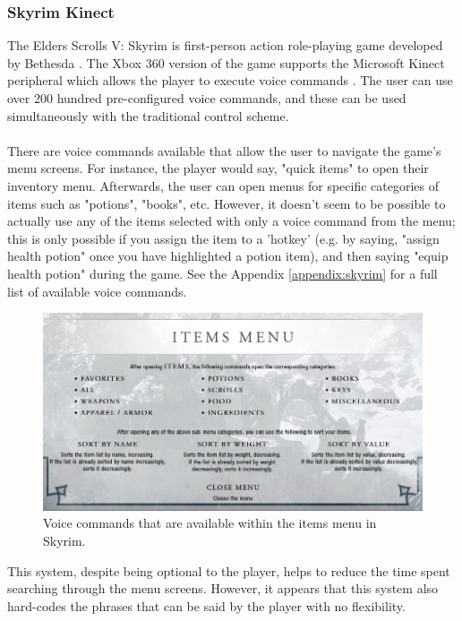 \documentclass[12pt]{article}
\begin{document}
\subsubsection{Skyrim Kinect}
The Elders Scrolls V: Skyrim is first-person action role-playing game developed by Bethesda \cite{RefWorks:23}. The Xbox 360 version of the game supports the Microsoft Kinect peripheral which allows the player to execute voice commands \cite{RefWorks:24}. The user can use over 200 hundred pre-configured voice commands, and these can be used simultaneously with the traditional control scheme.
\\
\\
There are voice commands available that allow the user to navigate the game's menu screens. For instance, the player would say, "quick items" to open their inventory menu. Afterwards, the user can open menus for specific categories of items such as "potions", "books", etc. However, it doesn't seem to be possible to actually use any of the items selected with only a voice command from the menu; this is only possible if you assign the item to a 'hotkey' (e.g. by saying, "assign health potion" once you have highlighted a potion item), and then saying "equip health potion" during the game. See the Appendix \ref{appendix:skyrim} for a full list of available voice commands.
\begin{center}
\begin{figure}[H]
  \includegraphics[width=\textwidth]{skyrim-item-commands.png}
  \caption{Voice commands that are available within the items menu in Skyrim.}
\end{figure}
\end{center}
This system, despite being optional to the player, helps to reduce the time spent searching through the menu screens. However, it appears that this system also hard-codes the phrases that can be said by the player with no flexibility.
\end{document}
